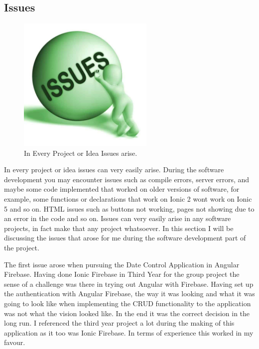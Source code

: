 \subsection{Issues}

\begin{figure}[h!]
	\caption{In Every Project or Idea Issues arise.}
	\label{image:issues}
	\centering
	\includegraphics[width=0.58\textwidth]{images/issues.jpg}
\end{figure}

In every project or idea issues can very easily arise. During the software development you may encounter issues such as compile errors, server errors, and maybe some code implemented that worked on older versions of software, for example, some functions or declarations that work on Ionic 2 wont work on Ionic 5 and so on. HTML issues such as buttons not working, pages not showing due to an error in the code and so on. Issues can very easily arise in any software projects, in fact make that any project whatsoever. In this section I will be discussing the issues that arose for me during the software development part of the project. 
\newline

The first issue arose when pursuing the Date Control Application in Angular Firebase. Having done Ionic Firebase in Third Year for the group project the sense of a challenge was there in trying out Angular with Firebase. Having set up the authentication with Angular Firebase, the way it was looking and what it was going to look like when implementing the CRUD functionality to the application was not what the vision looked like. In the end it was the correct decision in the long run. I referenced the third year project a lot during the making of this application as it too was Ionic Firebase. In terms of experience this worked in my favour. 
\newline

